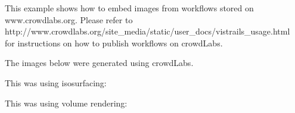 \documentclass{article}
\begin{document}
This example shows how to embed images from workflows stored on www.crowdlabs.org.
Please refer to \\
 http://www.crowdlabs.org/site\_media/static/user\_docs/vistrails\_usage.html
 \\
for instructions on how to publish workflows on crowdLabs.

The images below were generated using crowdLabs. 

This was using isosurfacing:\\



\vspace{1.0cm}
This was using volume rendering:\\
\end{document}
